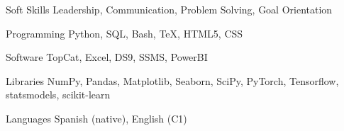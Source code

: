 
\begin{cvskills}

        \cvskill
        {Soft Skills}
    {Leadership, Communication, Problem Solving, Goal Orientation}

	\cvskill
	{Programming}
    {Python, SQL, Bash, \TeX, HTML5, CSS}

        \cvskill
        {Software}
    {TopCat, Excel, DS9, SSMS, PowerBI}

	\cvskill
	{Libraries}
    {NumPy, Pandas, Matplotlib, Seaborn, SciPy, PyTorch, Tensorflow, statsmodels, scikit-learn}

        \cvskill
        {Languages}
    {Spanish (native), English (C1)}
\end{cvskills}
